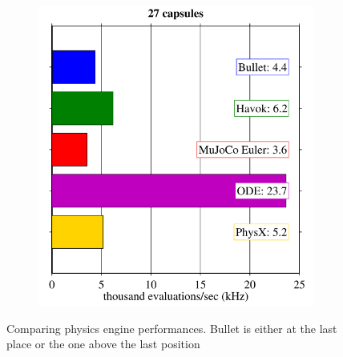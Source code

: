 \begin{figure}
\begin{subfigure}{0.31\textwidth}
      \caption{} \label{fig:1b}
    \end{subfigure}%
    \hspace*{\fill}   %
    \begin{subfigure}{0.31\textwidth}
      \includegraphics[width=\linewidth]{figures/BulletCom3.png}
      \caption{} \label{fig:1b}
    \end{subfigure}%

\caption{Comparing physics engine performances. Bullet is either at the last place or the one above the last position \cite{Erez2015} \label{fig:BulletComp}}
\end{figure}


